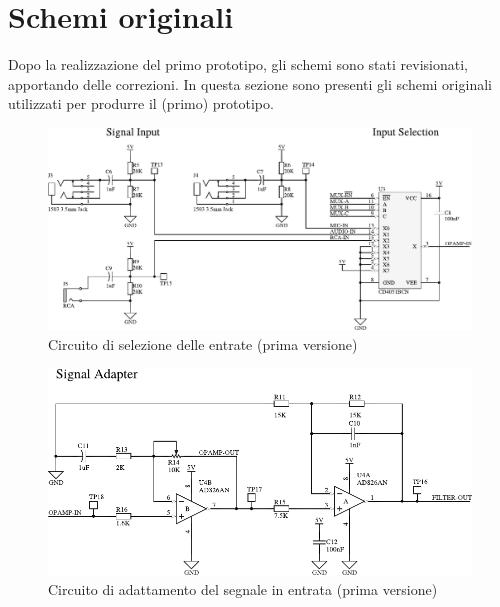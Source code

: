 \section{Schemi originali}
Dopo la realizzazione del primo prototipo, gli schemi sono stati revisionati,
apportando delle correzioni. In questa sezione sono presenti gli schemi
originali utilizzati per produrre il (primo) prototipo.
\begin{figure}[H] \centering
    \includegraphics[width=.9\linewidth]{figures/circuits/input-selection-v1.pdf}
    \caption{
        Circuito di selezione delle entrate (prima versione)
        \label{fig:input-selection-v1}
    }
\end{figure}
\begin{figure}[H] \centering
    \includegraphics[width=.9\linewidth]{figures/circuits/filter-ampl-v1.pdf}
    \caption[Circuito di adattamento del segnale]{
        Circuito di adattamento del segnale in entrata (prima versione)
        \label{fig:filter-ampl-v1}
    }
\end{figure}

